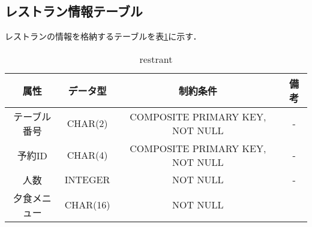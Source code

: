 \documentclass[../main]{subfiles}
\begin{document}
\subsection{レストラン情報テーブル}
レストランの情報を格納するテーブルを表\ref{fig:data_rest}に示す．
\begin{table}[H]
\begin{center}
\begin{tabular}{|c|c|c|c|}
\hline
    属性       & データ型      &  制約条件     & 備考 \\ \hline \hline
    テーブル番号   & CHAR(2)       & COMPOSITE PRIMARY KEY, NOT NULL  &  - \\ \hline
    予約ID     & CHAR(4)       &    COMPOSITE PRIMARY KEY, NOT NULL   &   - \\ \hline
    人数     & INTEGER     &    NOT NULL   &   - \\ \hline
    夕食メニュー     & CHAR(16)      &  NOT NULL           & \\ \hline 
    \end{tabular}
    \caption{restrant}
    \label{fig:data_rest} 
\end{center}
\end{table}
\end{document}
